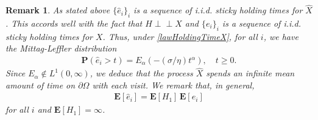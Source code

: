 \documentclass[11pt,a4paper]{article}
\newtheorem{remark}{Remark}[section]
\newcommand{\indep}{\perp \! \! \! \perp}
\begin{document}
\begin{remark}
As stated above $\{\hat{e}_i\}_i$ is a sequence of i.i.d. sticky holding times for $\hat{X}$. This accords well with the fact that $H\indep X$ and $\{e_i\}_i$ is a sequence of i.i.d. sticky holding times for $X$. Thus, under \eqref{lawHoldingTimeX}, for all $i$, we have the Mittag-Leffler distribution
\begin{align}
\label{holdingML}
\mathbf{P}(\hat{e}_i > t) = E_\alpha (-(\sigma / \eta) t^\alpha), \quad t\geq 0.
\end{align}
Since $E_\alpha \notin L^1(0, \infty)$, we deduce that the process $\hat{X}$ spends an infinite mean amount of time on $\partial \Omega$ with each visit. We remark that, in general, 
\begin{align*}
\mathbf{E}[\hat{e}_i] = \mathbf{E}[H_1]\, \mathbf{E}[e_i]
\end{align*}
for all $i$ and $\mathbf{E}[H_1]=\infty$.
\end{remark}
\end{document}
